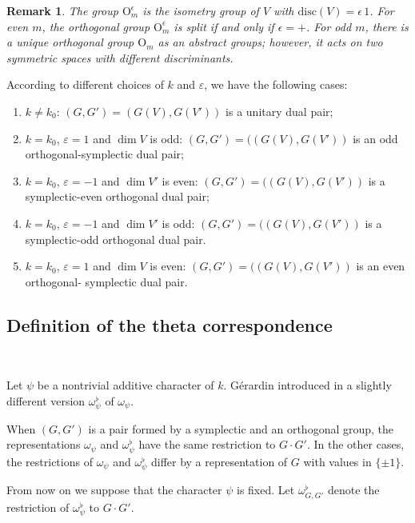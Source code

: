 \documentclass[12pt]{amsart}
\numberwithin{equation}{subsection}
\newtheorem{remark}[equation]{Remark}
\newcommand{\disc}{\operatorname{disc}}
\def\disc{{\mathrm{disc}}}
\def\rO{{\mathrm{O}}}
\def\disc{{\mathrm{disc}}}
\begin{document}
\begin{remark}
{\rm The group $\rO_m^\epsilon$ is the isometry group of $V$ with $\disc(V)=\epsilon\, 1$. For even $m$, the  orthogonal group $\rO_m^\epsilon$ is split if and only if $\epsilon=+$. For odd $m$,
there is a unique orthogonal group $\rO_m$ as an abstract groups; however, it acts on two symmetric spaces with different discriminants.}
\end{remark}

\smallskip

According to different choices of $k$ and $\varepsilon$, we have the following cases:
\begin{enumerate}
\item
$k\ne k_0$:  $(G,G')=(G(V ),G(V'))$ is a unitary dual pair;
\item
$k=k_0$, $\varepsilon=1$ and $\dim V$ is odd: $(G,G')=((G(V ),G(V'))$  is an odd orthogonal-symplectic dual pair;
\item
$k=k_0$,  $\varepsilon=-1$ and $\dim V'$ is even: $(G,G')=((G(V ),G(V'))$  is a symplectic-even orthogonal dual pair;
\item
$k=k_0$, $\varepsilon= -1$ and $\dim V'$ is odd: $(G,G')=((G(V ),G(V'))$  is a symplectic-odd orthogonal dual pair. 
\item
$k=k_0$,  $\varepsilon=1$ and $\dim V$ is even: $(G,G')=((G(V ),G(V'))$ is an even orthogonal- symplectic dual pair.
\end{enumerate}


\subsection{Definition of the theta correspondence}\

Let $\psi$ be a nontrivial additive character of $k$.
G\'erardin introduced in  \cite[Theorem~2.4]{Ger} a slightly different  version $\omega_\psi^\flat$  of $\omega_\psi$. 


When $(G,G')$ is a pair formed by a symplectic and an orthogonal group, the representations $\omega_\psi$ and $\omega_\psi^\flat$ have the same restriction to $G\cdot G'$.
In the other cases, the restrictions of $\omega_\psi$ and $\omega_\psi^\flat$ differ by a representation of $G$ with values in $\{\pm 1\}$. 

From now on we suppose that the character $\psi$ is fixed. Let $\omega^\flat_{G,G'}$ denote the restriction of $\omega^\flat_\psi$ to $G\cdot G'$. 


\smallskip
\end{document}
